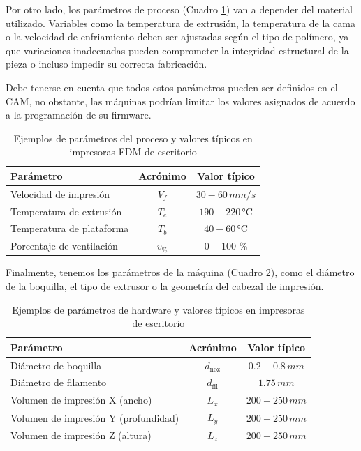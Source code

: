 Por otro lado, los parámetros de proceso (Cuadro \ref{tab:param-proceso}) van a depender del material utilizado. Variables como la temperatura de extrusión, la temperatura de la cama o la velocidad de enfriamiento deben ser ajustadas según el tipo de polímero, ya que variaciones inadecuadas pueden comprometer la integridad estructural de la pieza o incluso impedir su correcta fabricación.


Debe tenerse en cuenta que todos estos parámetros pueden ser definidos en el CAM, no obstante, las máquinas podrían limitar los valores asignados de acuerdo a la programación de su firmware.


\begin{table}[ht]
  \centering
  \caption{Ejemplos de parámetros del proceso y valores típicos en impresoras FDM de escritorio}
  \label{tab:param-proceso}
  \begin{tabular}{@{} l c c @{}}
    \toprule
    Parámetro                         & Acrónimo  & Valor típico  \\
    \midrule
    Velocidad de impresión            & $V_{f}$ &    $\mathrm{30-60}\,mm/s$  \\
    Temperatura de extrusión          & $T_{e}$  &    $\mathrm{190-220}\, \si{\celsius}$\\
    Temperatura de plataforma         & $T_{b}$   & $\mathrm{40-60}\, \si{\celsius}$ \\
    Porcentaje de ventilación         & $v_{\%}$ & $\mathrm{0-100}$ $\%$\\
    \bottomrule
  \end{tabular}
\end{table}

Finalmente, tenemos los parámetros de la máquina (Cuadro \ref{tab:param-hardware}), como el diámetro de la boquilla, el tipo de extrusor o la geometría del cabezal de impresión. 

\begin{table}[ht]
  \centering
  \caption{Ejemplos de parámetros de hardware y valores típicos en impresoras de escritorio}
  \label{tab:param-hardware}
  \begin{tabular}{@{} l c c@{}}
    \toprule
    Parámetro                                   & Acrónimo & Valor típico  \\
    \midrule
    Diámetro de boquilla                        & $d_{\mathrm{noz}}$ &  $\mathrm{0.2-0.8}\,mm$ \\
    Diámetro de filamento                       & $d_{\mathrm{fil}}$ & $\mathrm{1.75}\,mm$ \\
    Volumen de impresión X (ancho)              & $L_{x}$   & $\mathrm{200-250}\,mm$\\
    Volumen de impresión Y (profundidad)        & $L_{y}$   & $\mathrm{200-250}\,mm$ \\
    Volumen de impresión Z (altura)             & $L_{z}$   & $\mathrm{200-250}\,mm$ \\
    \bottomrule
  \end{tabular}
\end{table}

